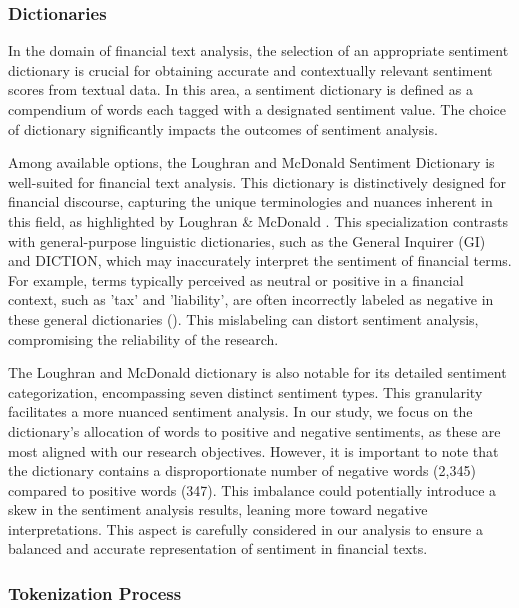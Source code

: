 \subsubsection{Dictionaries}
\label{sec:dict}

In the domain of financial text analysis, the selection of an appropriate sentiment dictionary is crucial for obtaining accurate and contextually relevant sentiment scores from textual data. In this area, a sentiment dictionary is defined as a compendium of words each tagged with a designated sentiment value. The choice of dictionary significantly impacts the outcomes of sentiment analysis.

Among available options, the Loughran and McDonald Sentiment Dictionary is well-suited for financial text analysis. This dictionary is distinctively designed for financial discourse, capturing the unique terminologies and nuances inherent in this field, as highlighted by Loughran \& McDonald \parencite*{loughran2011liability}. This specialization contrasts with general-purpose linguistic dictionaries, such as the General Inquirer (GI) and DICTION, which may inaccurately interpret the sentiment of financial terms. For example, terms typically perceived as neutral or positive in a financial context, such as 'tax' and 'liability', are often incorrectly labeled as negative in these general dictionaries (\cite{li2010information}). This mislabeling can distort sentiment analysis, compromising the reliability of the research.

The Loughran and McDonald dictionary is also notable for its detailed sentiment categorization, encompassing seven distinct sentiment types. This granularity facilitates a more nuanced sentiment analysis. In our study, we focus on the dictionary's allocation of words to positive and negative sentiments, as these are most aligned with our research objectives. However, it is important to note that the dictionary contains a disproportionate number of negative words (2,345) compared to positive words (347). This imbalance could potentially introduce a skew in the sentiment analysis results, leaning more toward negative interpretations. This aspect is carefully considered in our analysis to ensure a balanced and accurate representation of sentiment in financial texts.

\subsubsection{Tokenization Process}

